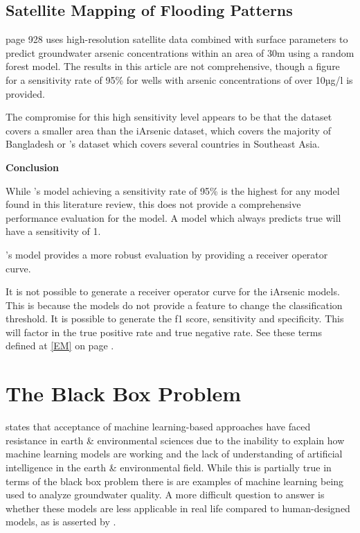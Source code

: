 \subsection{Satellite Mapping of Flooding Patterns}

\cite{Connolly2022} page 928 uses high-resolution satellite data combined with surface parameters to predict groundwater arsenic concentrations within an area of 30m using a random forest model. The results in this article are not comprehensive, though a figure for a sensitivity rate of 95\% for wells with arsenic concentrations of over 10µg/l is provided.

The compromise for this high sensitivity level appears to be that the dataset covers a smaller area than the iArsenic dataset, which covers the majority of Bangladesh or \cite{Winkel2008}'s dataset which covers several countries in Southeast Asia.

\textbf{Conclusion}

While \cite{Connolly2022}'s model achieving a sensitivity rate of 95\% is the highest for any model found in this literature review, this does not provide a comprehensive performance evaluation for the model. A model which always predicts true will have a sensitivity of 1.

\cite{Winkel2008}'s model provides a more robust evaluation by providing a receiver operator curve.

It is not possible to generate a receiver operator curve for the iArsenic models. This is because the models do not provide a feature to change the classification threshold. It is possible to generate the f1 score, sensitivity and specificity. This will factor in the true positive rate and true negative rate. See these terms defined at \ref{EM} on page \pageref{EM}.

\section{The Black Box Problem}

\cite{Fleming2021} states that acceptance of machine learning-based approaches have faced resistance in earth \& environmental sciences due to the inability to explain how machine learning models are working and the lack of understanding of artificial intelligence in the earth \& environmental field. While this is partially true in terms of the black box problem there is are examples of machine learning being used to analyze groundwater quality. A more difficult question to answer is whether these models are less applicable in real life compared to human-designed models, as is asserted by \cite{Guidotti2018}.

